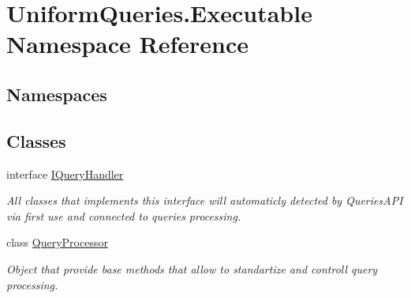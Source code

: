 \hypertarget{namespace_uniform_queries_1_1_executable}{}\section{Uniform\+Queries.\+Executable Namespace Reference}
\label{namespace_uniform_queries_1_1_executable}
\subsection*{Namespaces}
\begin{DoxyCompactItemize}
\end{DoxyCompactItemize}
\subsection*{Classes}
\begin{DoxyCompactItemize}
\item 
interface \mbox{\hyperlink{interface_uniform_queries_1_1_executable_1_1_i_query_handler}{I\+Query\+Handler}}
\begin{DoxyCompactList}\small\item\em All classes that implements this interface will automaticly detected by Queries\+A\+PI via first use and connected to queries processing. \end{DoxyCompactList}\item 
class \mbox{\hyperlink{class_uniform_queries_1_1_executable_1_1_query_processor}{Query\+Processor}}
\begin{DoxyCompactList}\small\item\em Object that provide base methods that allow to standartize and controll query processing. \end{DoxyCompactList}\end{DoxyCompactItemize}

